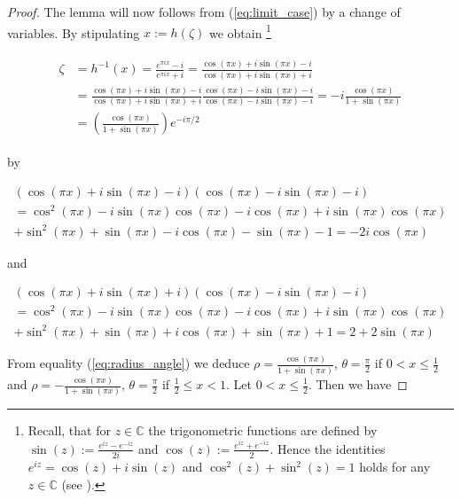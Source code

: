 \begin{proof}
The lemma will now follows from (\ref{eq:limit_case}) by a change of variables. By stipulating $x := h\left( \zeta \right)$ we obtain \footnote{
		Recall, that for $z \in \mathbb{C}$ the trigonometric functions are defined by $\sin(z) := \frac{e^{iz} - e^{-iz}}{2i}$ and $\cos(z) := \frac{e^{iz} + e^{-iz}}{2}$. Hence the identities $e^{iz} = \cos(z) + i\sin(z)$ and $\cos^2(z) + \sin^2(z) = 1$ holds for any $z \in \mathbb{C}$ (see \cite[42--44]{ahlfors:complex_analysis:1979}).	
	}

\begin{gather}
	\begin{aligned}
		\zeta &= h^{-1}(x) = \frac{e^{\pi i x}- i}{e^{\pi i x} + i} = \frac{\cos(\pi x) + i\sin(\pi x) - i}{\cos(\pi x) + i\sin(\pi x) + i}\\
		&= \frac{\cos(\pi x) + i\sin(\pi x) - i}{\cos(\pi x) + i\sin(\pi x) + i}\frac{\cos(\pi x) - i\sin(\pi x) - i}{\cos(\pi x) - i\sin(\pi x) - i} = -i \frac{\cos(\pi x)}{1 + \sin(\pi x)}\\
		&= \left( \frac{\cos(\pi x)}{1 + \sin(\pi x)} \right)e^{-i\pi/2}
	\end{aligned}
	\label{eq:radius_angle}
\end{gather}

by

\begin{multline*}
	\left(\cos(\pi x) + i\sin(\pi x) - i\right)\left(\cos(\pi x) - i\sin(\pi x) - i\right)\\ = \cos^2(\pi x) - i\sin(\pi x)\cos(\pi x)	
		-i\cos(\pi x) + i\sin(\pi x)\cos(\pi x)\\
	 	+ \sin^2(\pi x) + \sin(\pi x) - i \cos(\pi x) - \sin(\pi x) - 1 = -2i \cos(\pi x)  
\end{multline*}

and
	
\begin{multline*}
	\left( \cos(\pi x) + i\sin(\pi x) + i \right)\left( \cos(\pi x) - i\sin(\pi x) - i \right)\\ = \cos^2(\pi x) - i\sin(\pi x)\cos(\pi x) - i\cos(\pi x) + i\sin(\pi x)\cos(\pi x)\\
	+ \sin^2(\pi x) + \sin(\pi x)+ i \cos(\pi x) + \sin(\pi x) + 1 = 2 + 2\sin(\pi x)
\end{multline*}

	From equality (\ref{eq:radius_angle}) we deduce $\rho = \frac{\cos(\pi x)}{1 + \sin(\pi x)}$, $\theta = \frac{\pi}{2}$ if $0 < x \leqslant \frac{1}{2}$ and $\rho = -\frac{\cos(\pi x)}{1 + \sin(\pi x)}$, $\theta = \frac{\pi}{2}$ if $\frac{1}{2} \leqslant x < 1$. Let $0 < x \leqslant \frac{1}{2}$. Then we have


\end{proof}
